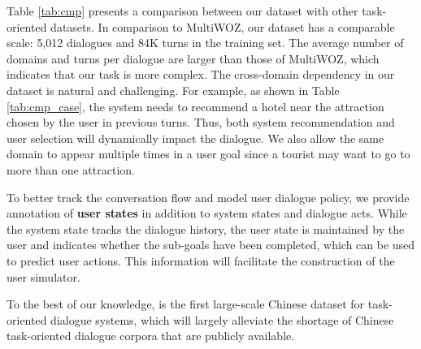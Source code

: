 Table \ref{tab:cmp} presents a comparison between our dataset with other task-oriented datasets. In comparison to MultiWOZ, our dataset has a comparable scale: 5,012 dialogues and 84K turns in the training set. The average number of domains and turns per dialogue are larger than those of MultiWOZ, which indicates that our task is more complex. The cross-domain dependency in our dataset is natural and challenging. 
For example, as shown in Table \ref{tab:cmp_case}, the system needs to recommend a hotel near the attraction chosen by the user in previous turns. Thus, both system recommendation and user selection will dynamically impact the dialogue. 
We also allow the same domain to appear multiple times in a user goal since a tourist may want to go to more than one attraction. 

To better track the conversation flow and model user dialogue policy, we provide annotation of \textbf{user states} in addition to system states and dialogue acts.
While the system state tracks the dialogue history, the user state is maintained by the user and indicates whether the sub-goals have been completed, which can be used to predict user actions. This information will facilitate the construction of the user simulator. 

To the best of our knowledge, \textbf{\datasetName} is the first large-scale Chinese dataset for task-oriented dialogue systems, which will largely alleviate the shortage of Chinese task-oriented dialogue corpora that are publicly available. 

